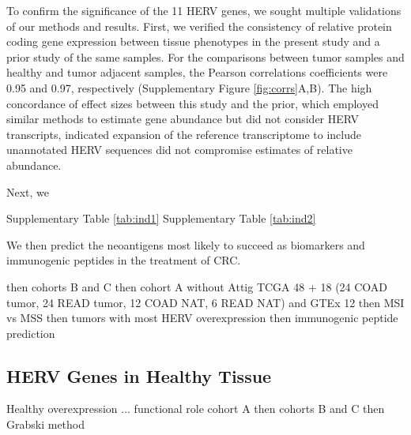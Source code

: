 To confirm the significance of the 11 HERV genes, we sought multiple validations of our methods and results.
First, we verified the consistency of relative protein coding gene expression between tissue phenotypes in the present study and a prior study of the same samples.
For the comparisons between tumor samples and healthy and tumor adjacent samples, the Pearson correlations coefficients were 0.95 and 0.97, respectively (Supplementary Figure \ref{fig:corrs}A,B).
The high concordance of effect sizes between this study and the prior, which employed similar methods to estimate gene abundance but did not consider HERV transcripts, indicated expansion of the reference transcriptome to include unannotated HERV sequences did not compromise estimates of relative abundance.

Next, we


Supplementary Table \ref{tab:ind1}
Supplementary Table \ref{tab:ind2}

We then predict the neoantigens most likely to succeed as biomarkers and immunogenic peptides in the treatment of CRC.

then cohorts B and C
then cohort A without Attig TCGA 48 + 18 (24 COAD tumor, 24 READ tumor, 12 COAD NAT, 6 READ NAT) and GTEx 12
then MSI vs MSS
then tumors with most HERV overexpression
then immunogenic peptide prediction

\subsection*{HERV Genes in Healthy Tissue}

Healthy overexpression ... functional role
cohort A
then cohorts B and C
then Grabski method
